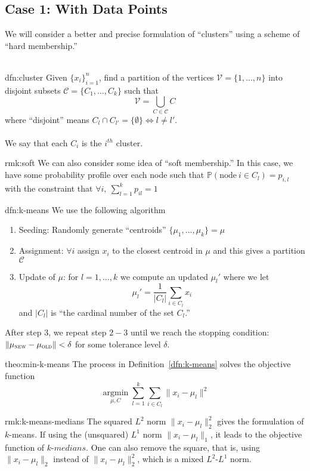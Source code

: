 \documentclass[12pt]{article}
\begin{document}
\subsection{Case 1: With Data Points}
We will consider a better and precise formulation of ``clusters'' using a scheme of ``hard membership.''
\\ \\
\begin{dfn}[Cluster]{dfn:cluster}
	Given $ \{ x_i \}_{i = 1}^n $, find a partition of the vertices $ \mathcal{V} = \{ 1, \ldots, n \} $
	into disjoint subsets $ \mathcal{C} = \{ C_1, \ldots, C_k \} $
	such that
	\[
	\mathcal{V} = \bigcup_{C \in \mathcal{C}} C
	\]
	where ``disjoint'' means $ C_{l} \cap C_{l'} = \{ \emptyset \} \iff l \neq l' $.
	\\ \\
	We say that each $ C_{i} $ is the $ i^{th} $ cluster.
\end{dfn}
\begin{rmk}{rmk:soft}
	We can also consider some idea of ``soft membership.''
	In this case, we have some probability profile over each node such that
	$\mathbb{P} (\text{node}~ i \in C_l) = p_{i,l}$ with the constraint that $ \forall i,~ \sum_{l = 1}^k p_{il} = 1$
\end{rmk}
\begin{dfn}[$ k $-means]{dfn:k-means}
	We use the following algorithm~\cite{lloyd-1982}
	\begin{enumerate}
	    \item Seeding: Randomly generate ``centroids'' $ \{ \mu_1, \ldots, \mu_k \} = \mu $
	    \item Assignment: $ \forall i $ assign $ x_i $ to the closest centroid in $ \mu $ and this gives a partition $ \mathcal{C} $
	    \item Update of $ \mu $: for $ l = 1, \ldots, k $ we compute an updated $ \mu_l' $ where we let
	    \[
	    \mu_l' = \frac{1}{| C_{l} |} \sum_{i \in C_l} x_i
	    \]
	    and $ | C_{l} | $ is ``the cardinal number of the set $ C_l $.''
	\end{enumerate}
	After step $ 3 $, we repeat step $ 2-3 $ until we reach the stopping condition: $\| \mu_{\textsc{new}} - \mu_{\textsc{old}} \| < \delta$ for some tolerance level $ \delta $.
\end{dfn}
\begin{theo}{theo:min-k-means}
	The process in Definition~\ref{dfn:k-means} solves the objective function
	\[
	\underset{\mu, C}{\operatorname{argmin}}  \sum_{l = 1}^k \sum_{i \in C_l} \| x_i - \mu_l \|^2
	\]
\end{theo}
\begin{rmk}{rmk:k-means-medians}
The squared $L^2$ norm $\| x_i - \mu_l \|_2^2$ gives the formulation of $k$-means. If using the (unsquared) $L^1$ norm $\| x_i - \mu_l \|_1$, it leads to the objective function of $\textit{k-medians}$. One can also remove the square, that is, using $\| x_i - \mu_l \|_2$ instead of $\| x_i - \mu_l \|_2^2$, which is a mixed $L^2$-$L^1$ norm.
\end{rmk}

{}

\end{document}
